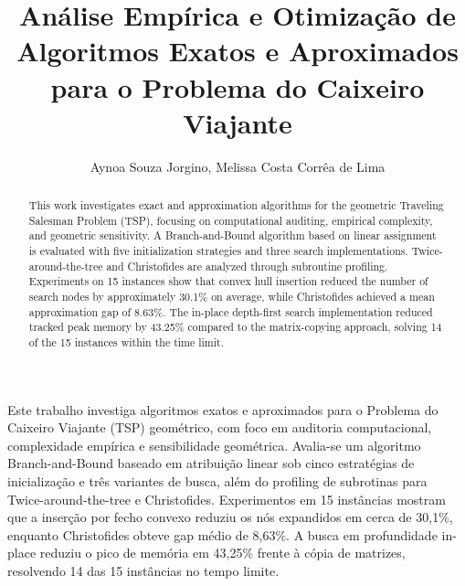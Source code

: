 \sloppy

\title{Análise Empírica e Otimização de Algoritmos Exatos e Aproximados para o Problema do Caixeiro Viajante}

\author{Aynoa Souza Jorgino, Melissa Costa Corrêa de Lima}

\address{Departamento de Ciência da Computação -- Universidade Federal de Minas Gerais (UFMG)\\
  Belo Horizonte -- MG -- Brasil
}

 

\maketitle

\begin{abstract}
  This work investigates exact and approximation algorithms for the geometric Traveling Salesman Problem (TSP), focusing on computational auditing, empirical complexity, and geometric sensitivity. A Branch-and-Bound algorithm based on linear assignment is evaluated with five initialization strategies and three search implementations. Twice-around-the-tree and Christofides are analyzed through subroutine profiling. Experiments on 15 instances show that convex hull insertion reduced the number of search nodes by approximately 30.1\% on average, while Christofides achieved a mean approximation gap of 8.63\%. The in-place depth-first search implementation reduced tracked peak memory by 43.25\% compared to the matrix-copying approach, solving 14 of the 15 instances within the time limit.
\end{abstract}
     
\begin{resumo} 
  Este trabalho investiga algoritmos exatos e aproximados para o Problema do Caixeiro Viajante (TSP) geométrico, com foco em auditoria computacional, complexidade empírica e sensibilidade geométrica. Avalia-se um algoritmo Branch-and-Bound baseado em atribuição linear sob cinco estratégias de inicialização e três variantes de busca, além do profiling de subrotinas para Twice-around-the-tree e Christofides. Experimentos em 15 instâncias mostram que a inserção por fecho convexo reduziu os nós expandidos em cerca de 30,1\%, enquanto Christofides obteve gap médio de 8,63\%. A busca em profundidade in-place reduziu o pico de memória em 43,25\% frente à cópia de matrizes, resolvendo 14 das 15 instâncias no tempo limite.
\end{resumo}


